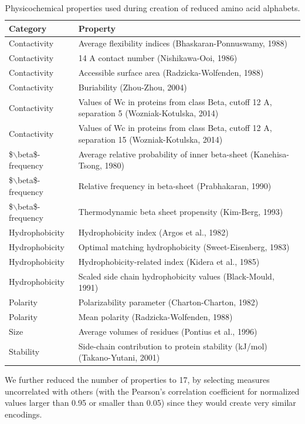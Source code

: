 \documentclass{bioinfo}
\begin{document}
\begin{methods}
\begin{table}[ht]
\centering
\begin{tabular}{ll}
  \hline
Category & Property \\ 
  \hline
Contactivity & Average flexibility indices (Bhaskaran-Ponnuswamy, 1988) \\ 
  Contactivity & 14 A contact number (Nishikawa-Ooi, 1986) \\ 
  Contactivity & Accessible surface area (Radzicka-Wolfenden, 1988) \\ 
  Contactivity & Buriability (Zhou-Zhou, 2004) \\ 
  Contactivity & Values of Wc in proteins from class Beta, cutoff 12 A, separation 5 (Wozniak-Kotulska, 2014) \\ 
  Contactivity & Values of Wc in proteins from class Beta, cutoff 12 A, separation 15 (Wozniak-Kotulska, 2014) \\ 
  \$$\backslash$beta\$-frequency & Average relative probability of inner beta-sheet (Kanehisa-Tsong, 1980) \\ 
  \$$\backslash$beta\$-frequency & Relative frequency in beta-sheet (Prabhakaran, 1990) \\ 
  \$$\backslash$beta\$-frequency & Thermodynamic beta sheet propensity (Kim-Berg, 1993) \\ 
  Hydrophobicity & Hydrophobicity index (Argos et al., 1982) \\ 
  Hydrophobicity & Optimal matching hydrophobicity (Sweet-Eisenberg, 1983) \\ 
  Hydrophobicity & Hydrophobicity-related index (Kidera et al., 1985) \\ 
  Hydrophobicity & Scaled side chain hydrophobicity values (Black-Mould, 1991) \\ 
  Polarity & Polarizability parameter (Charton-Charton, 1982) \\ 
  Polarity & Mean polarity (Radzicka-Wolfenden, 1988) \\ 
  Size & Average volumes of residues (Pontius et al., 1996) \\ 
  Stability & Side-chain contribution to protein stability (kJ/mol) (Takano-Yutani, 2001) \\ 
   \hline
\end{tabular}
\caption{Physicochemical properties used during creation of reduced amino acid alphabets.} 
\end{table}

We further reduced the number of properties to 17, by selecting measures uncorrelated with others (with the Pearson's correlation coefficient for normalized values larger than 0.95 or smaller than 0.05) since they would create very similar encodings.


\end{methods}
\end{document}
